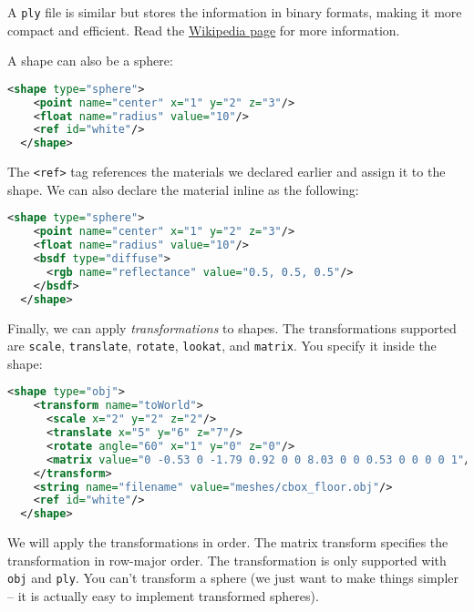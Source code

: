 A \lstinline{ply} file is similar but stores the information in binary formats, making it more compact and efficient. Read the \href{https://en.wikipedia.org/wiki/PLY_(file_format)}{Wikipedia page} for more information.

A shape can also be a sphere:
\begin{lstlisting}[language=xml]
  <shape type="sphere">
    <point name="center" x="1" y="2" z="3"/>
    <float name="radius" value="10"/>
    <ref id="white"/>
  </shape>
\end{lstlisting}

The \lstinline{<ref>} tag references the materials we declared earlier and assign it to the shape. We can also declare the material inline as the following:
\begin{lstlisting}[language=xml]
  <shape type="sphere">
    <point name="center" x="1" y="2" z="3"/>
    <float name="radius" value="10"/>
    <bsdf type="diffuse">
      <rgb name="reflectance" value="0.5, 0.5, 0.5"/>
    </bsdf>
  </shape>
\end{lstlisting}

Finally, we can apply \emph{transformations} to shapes. The transformations supported are \lstinline{scale}, \lstinline{translate}, \lstinline{rotate}, \lstinline{lookat}, and \lstinline{matrix}. You specify it inside the shape:
\begin{lstlisting}[language=xml]
  <shape type="obj">
    <transform name="toWorld">
      <scale x="2" y="2" z="2"/>
      <translate x="5" y="6" z="7"/>
      <rotate angle="60" x="1" y="0" z="0"/>
      <matrix value="0 -0.53 0 -1.79 0.92 0 0 8.03 0 0 0.53 0 0 0 0 1"/>
    </transform>
    <string name="filename" value="meshes/cbox_floor.obj"/>
    <ref id="white"/>
  </shape>
\end{lstlisting}
We will apply the transformations in order. The matrix transform specifies the transformation in row-major order.
The transformation is only supported with \lstinline{obj} and \lstinline{ply}. You can't transform a sphere (we just want to make things simpler -- it is actually easy to implement transformed spheres).

